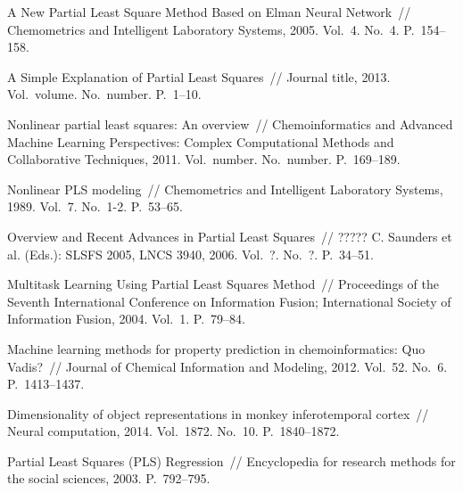 \documentclass[12pt,twoside]{article}
\begin{document}
\begin{thebibliography}{10}
{A New Partial Least Square Method Based on Elman Neural Network}~//
Chemometrics and Intelligent Laboratory Systems, 2005.
Vol.~4.
No.~4.
P.~154--158.


{A Simple Explanation of Partial Least Squares}~//
Journal title, 2013.
Vol.~volume.
No.~number.
P.~1--10.


{Nonlinear partial least squares: An overview}~//
Chemoinformatics and Advanced Machine Learning Perspectives: Complex Computational Methods and Collaborative Techniques, 2011.
Vol.~number.
No.~number.
P.~169--189.


{Nonlinear PLS modeling}~//
Chemometrics and Intelligent Laboratory Systems, 1989.
Vol.~7.
No.~1-2.
P.~53--65.

{Overview and Recent Advances in Partial Least Squares}~//
????? C. Saunders et al. (Eds.): SLSFS 2005, LNCS 3940, 2006.
Vol.~?.
No.~?.
P.~34--51.

{Multitask Learning Using Partial Least Squares Method}~//
Proceedings of the Seventh International Conference on Information Fusion; International Society of Information Fusion, 2004.
Vol.~1.
P.~79--84.

{Machine learning methods for property prediction in chemoinformatics: Quo Vadis?}~//
Journal of Chemical Information and Modeling, 2012.
Vol.~52.
No.~6.
P.~1413--1437.

{Dimensionality of object representations in monkey inferotemporal cortex}~//
Neural computation, 2014.
Vol.~1872.
No.~10.
P.~1840--1872.

{Partial Least Squares (PLS) Regression}~//
Encyclopedia for research methods for the social sciences, 2003.
P.~792--795.


\end{thebibliography}
\end{document}

